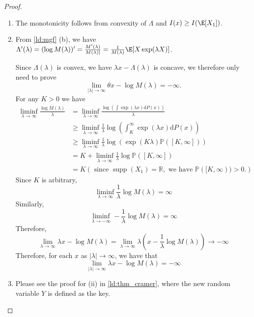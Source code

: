 \documentclass{article}
\begin{document}
\begin{proof}
\begin{enumerate}[label=(\alph*)]
	We next prove the other two conlusion:
	
	If $x\geq\E[X_1]$ , for $\lambda<0$,\\
		\begin{align*}
		\lambda &x-\Lambda(\lambda)\leq\lambda\E[X_1]-\Lambda(\lambda)\leq I(\E[X_1])=0\\
		&\Rightarrow I(x)=\sup\limits_{\lambda\geq0}[\lambda x-\Lambda(\lambda)]
		\end{align*}
		The proof is similar for $x<\E[X_1]$.
	\item  The monotonicity follows from convexity of $\Lambda$ and  $I(x)\ge I (\E[X_1])$.
	\item
		From \cref{ld:mgf} (b), we have $\Lambda'(\lambda) = (\log M(\lambda))'= \frac{M'(\lambda)}{M(\lambda)]} = \frac{1}{M(\lambda)}\E[X\exp(\lambda X)]$.
		
		Since $\Lambda(\lambda)$ is convex, we have $\lambda x - \Lambda(\lambda)$  is concave, we therefore only need to prove 
		$$
\lim _{|\lambda| \rightarrow \infty} \theta x-\log M(\lambda)=-\infty.
$$
		For any $K>0$ we have
$$
\begin{aligned}
\liminf _{\lambda \rightarrow \infty} \frac{\log M(\lambda)}{\lambda} &=\liminf _{\lambda \rightarrow \infty} \frac{\log \left(\int \exp (\lambda x) \mathrm{d} P(x)\right)}{\lambda} \\
& \geq \liminf _{\lambda \rightarrow \infty} \frac{1}{\lambda} \log \left(\int_{K}^{\infty} \exp (\lambda x) \mathrm{d} P(x)\right) \\
& \geq \liminf _{\lambda \rightarrow \infty} \frac{1}{\lambda} \log (\exp (K \lambda) \mathbb{P}([K, \infty])) \\
&=K+\liminf _{\lambda \rightarrow \infty} \frac{1}{\lambda} \log \mathbb{P}([K, \infty]) \\
&=K\left(\text { since } \operatorname{supp}\left(X_{1}\right)=\mathbb{R}, \text { we have } \mathbb{P}([K, \infty))>0 .\right)
\end{aligned}
$$
Since $K$ is arbitrary,
$$
\liminf _{\lambda \rightarrow \infty} \frac{1}{\lambda} \log M(\lambda)=\infty
$$
Similarly,
$$
\liminf _{\lambda \rightarrow-\infty}-\frac{1}{\lambda} \log M(\lambda)=\infty
$$
Therefore,
$$
\lim _{\lambda \rightarrow \infty} \lambda x-\log M(\lambda)=\lim _{\lambda \rightarrow \infty} \lambda\left(x-\frac{1}{\lambda} \log M(\lambda)\right) \rightarrow-\infty
$$
Therefore, for each $x$ as $|\lambda| \rightarrow \infty$, we have that
$$
\lim _{|\lambda| \rightarrow \infty} \lambda x-\log M(\lambda)=-\infty
$$

		
\item Please 	see the proof for (ii) in \cref{ld:thm_cramer}, where the new random variable $Y$ is defined as the key. 	
		
		
		
	\end{enumerate}
	\end{proof}
\end{document}
